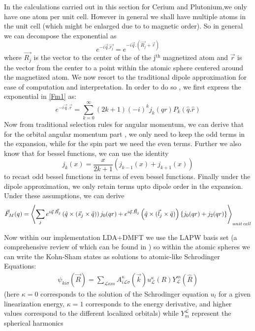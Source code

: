 \documentclass[10pt]{ruthesis}
\begin{document}
{In the calculations carried out in this section for Cerium and Plutonium,we only have one atom per unit cell. However in general we shall have multiple atoms in the unit cell (which might be enlarged due to to magnetic order). So in general we can decompose the exponential as
\begin{equation}
e^{-i\vec{q}.\vec{r_j}}= e^{-i\vec{q}.\left(\vec{R_j}+ \vec{r}\right)}
\end{equation}
where $\vec{R_j}$ is the vector to the center of the of the j$^\mathrm{th}$ magnetized atom and $\vec{r}$ is the vector from the center to a point within the atomic sphere centered around the magnetized atom.  We now resort to the traditional dipole approximation for ease of computation and interpretation. In order to do so , we first express the exponential in \ref{Fm1} as:
\begin{equation}
e^{-i\vec{q}.\vec{r}}= \sum^{\infty}_{k=0} (2k+1) (-i)^k j_k(qr) P_k(\hat{q}.\hat{r})
\end{equation}
Now from traditional selection rules for angular momentum, we can derive that for the orbital angular momentum part , we only need to keep the odd terms in the expansion, while for the spin part we need the even terms. Further we also know that for bessel functions, we can use the identity
\begin{equation}
j_k(x)= \frac{x}{2k+1} \left( j_{k-1}(x) +j_{k+1}(x)\right)
\end{equation}
to recast odd bessel functions in terms of even bessel functions. Finally under the dipole approximation, we only retain terms upto dipole order in the expansion. Under these assumptions, we can derive 
\begin{align}
\vec{F}_M(q)=  \left\langle \sum_{j}  e^{i\vec{q}.\vec{R_j}} \left( \hat{q} \times (\vec{s}_{j} \times \hat{q}) \right) j_{0}(qr)+ e^{i\vec{q}.\vec{R}_j}\left( \hat{q}\times (\vec{l}_{j} \times \hat{q}) \right) \left \lbrace j_{0}(qr) +j_{2}(qr) \right \rbrace \right\rangle _ {unit \hspace{0.5 mm} cell}
\end{align}

Now within our implementation LDA+DMFT we use the LAPW basis set (a comprehensive review of which can be found in \cite{LAPW_Book}) so within the atomic spheres we can write the Kohn-Sham states as solutions to atomic-like Schrodinger Equations:
 \begin{align}
 \psi_{ki \sigma}(\vec{R})=\sum_{\mathcal{L}\kappa m} A_{i \mathcal{L} \sigma }^{\kappa}(\vec{k}) u_{\mathcal{L}}^{\kappa}(R) Y_{\mathcal{L}}^{m}(\hat{R})
 \end{align}
 (here $\kappa=0 $ corresponds to the solution of the Schrodinger equation $u_{l}$ for a given linearization energy, $\kappa=1$ corresponds to the energy derivative, and higher values correspond to the different localized orbitals) while $Y_m^{\mathcal{L}}$ represent the spherical harmonics
 
}
\end{document}
